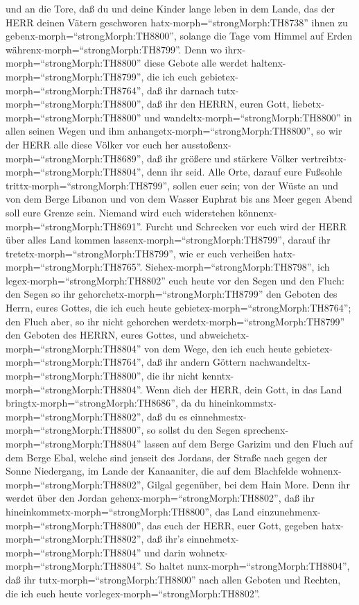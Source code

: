 und an die Tore,  daß du und deine Kinder lange leben in
dem Lande, das der HERR deinen Vätern geschworen
hatx-morph=``strongMorph:TH8738'' ihnen zu
gebenx-morph=``strongMorph:TH8800'', solange die Tage vom Himmel auf
Erden währenx-morph=``strongMorph:TH8799''.  Denn wo
ihrx-morph=``strongMorph:TH8800'' diese Gebote alle werdet
haltenx-morph=``strongMorph:TH8799'', die ich euch
gebietex-morph=``strongMorph:TH8764'', daß ihr darnach
tutx-morph=``strongMorph:TH8800'', daß ihr den HERRN, euren Gott,
liebetx-morph=``strongMorph:TH8800'' und
wandeltx-morph=``strongMorph:TH8800'' in allen seinen Wegen und ihm
anhangetx-morph=``strongMorph:TH8800'',  so wir der HERR
alle diese Völker vor euch her ausstoßenx-morph=``strongMorph:TH8689'',
daß ihr größere und stärkere Völker
vertreibtx-morph=``strongMorph:TH8804'', denn ihr seid. 
Alle Orte, darauf eure Fußsohle trittx-morph=``strongMorph:TH8799'',
sollen euer sein; von der Wüste an und von dem Berge Libanon und von dem
Wasser Euphrat bis ans Meer gegen Abend soll eure Grenze sein.
 Niemand wird euch widerstehen
könnenx-morph=``strongMorph:TH8691''. Furcht und Schrecken vor euch wird
der HERR über alles Land kommen lassenx-morph=``strongMorph:TH8799'',
darauf ihr tretetx-morph=``strongMorph:TH8799'', wie er euch verheißen
hatx-morph=``strongMorph:TH8765''. 
Siehex-morph=``strongMorph:TH8798'', ich
legex-morph=``strongMorph:TH8802'' euch heute vor den Segen und den
Fluch:  den Segen so ihr
gehorchetx-morph=``strongMorph:TH8799'' den Geboten des Herrn, eures
Gottes, die ich euch heute gebietex-morph=``strongMorph:TH8764'';
 den Fluch aber, so ihr nicht gehorchen
werdetx-morph=``strongMorph:TH8799'' den Geboten des HERRN, eures
Gottes, und abweichetx-morph=``strongMorph:TH8804'' von dem Wege, den
ich euch heute gebietex-morph=``strongMorph:TH8764'', daß ihr andern
Göttern nachwandeltx-morph=``strongMorph:TH8800'', die ihr nicht
kenntx-morph=``strongMorph:TH8804''.  Wenn dich der HERR,
dein Gott, in das Land bringtx-morph=``strongMorph:TH8686'', da du
hineinkommstx-morph=``strongMorph:TH8802'', daß du es
einnehmestx-morph=``strongMorph:TH8800'', so sollst du den Segen
sprechenx-morph=``strongMorph:TH8804'' lassen auf dem Berge Garizim und
den Fluch auf dem Berge Ebal,  welche sind jenseit des
Jordans, der Straße nach gegen der Sonne Niedergang, im Lande der
Kanaaniter, die auf dem Blachfelde wohnenx-morph=``strongMorph:TH8802'',
Gilgal gegenüber, bei dem Hain More.  Denn ihr werdet über
den Jordan gehenx-morph=``strongMorph:TH8802'', daß ihr
hineinkommetx-morph=``strongMorph:TH8800'', das Land
einzunehmenx-morph=``strongMorph:TH8800'', das euch der HERR, euer Gott,
gegeben hatx-morph=``strongMorph:TH8802'', daß ihr's
einnehmetx-morph=``strongMorph:TH8804'' und darin
wohnetx-morph=``strongMorph:TH8804''.  So haltet
nunx-morph=``strongMorph:TH8804'', daß ihr
tutx-morph=``strongMorph:TH8800'' nach allen Geboten und Rechten, die
ich euch heute vorlegex-morph=``strongMorph:TH8802''.


